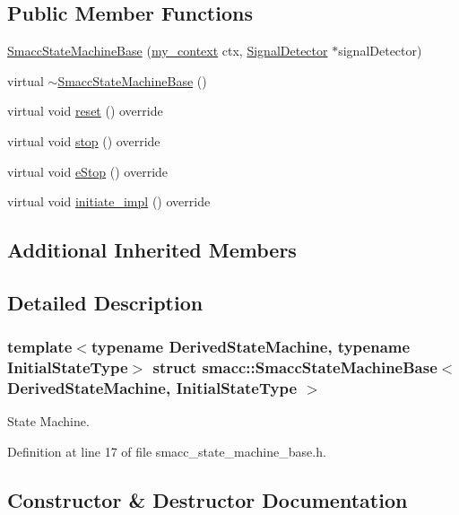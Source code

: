 \subsection*{Public Member Functions}
\begin{DoxyCompactItemize}
\item 
\hyperlink{structsmacc_1_1SmaccStateMachineBase_a47508a2d301007546d4c70dedd2ade4b}{Smacc\+State\+Machine\+Base} (\hyperlink{common_8h_af2dcacead80d69b96952496fe413bbfe}{my\+\_\+context} ctx, \hyperlink{classsmacc_1_1SignalDetector}{Signal\+Detector} $\ast$signal\+Detector)
\item 
virtual \hyperlink{structsmacc_1_1SmaccStateMachineBase_af08edc30fb749631b5459eb7438129ec}{$\sim$\+Smacc\+State\+Machine\+Base} ()
\item 
virtual void \hyperlink{structsmacc_1_1SmaccStateMachineBase_af34aec9fa012f0e3858131c84abfd5ed}{reset} () override
\item 
virtual void \hyperlink{structsmacc_1_1SmaccStateMachineBase_aaa9baa888888165998aa990ca299e30b}{stop} () override
\item 
virtual void \hyperlink{structsmacc_1_1SmaccStateMachineBase_a3ba186af957cfe4ddbd7bdbe10630743}{e\+Stop} () override
\item 
virtual void \hyperlink{structsmacc_1_1SmaccStateMachineBase_a2dc1cd9a25b80f00602f1faab9b01e7b}{initiate\+\_\+impl} () override
\end{DoxyCompactItemize}
\subsection*{Additional Inherited Members}


\subsection{Detailed Description}
\subsubsection*{template$<$typename Derived\+State\+Machine, typename Initial\+State\+Type$>$\newline
struct smacc\+::\+Smacc\+State\+Machine\+Base$<$ Derived\+State\+Machine, Initial\+State\+Type $>$}

State Machine. 

Definition at line 17 of file smacc\+\_\+state\+\_\+machine\+\_\+base.\+h.



\subsection{Constructor \& Destructor Documentation}
\mbox{\label{structsmacc_1_1SmaccStateMachineBase_a47508a2d301007546d4c70dedd2ade4b}} 
